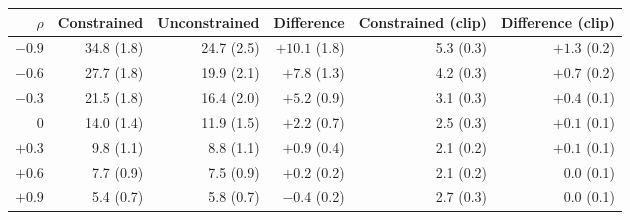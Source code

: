 \begin{tabular}{rrrrrr}
\toprule
$\rho$ & Constrained & Unconstrained & Difference & Constrained (clip) & Difference (clip) \\
\midrule
$-0.9$ & 34.8 (1.8) & 24.7 (2.5) & $+10.1$ (1.8) & 5.3 (0.3) & $+1.3$ (0.2) \\
$-0.6$ & 27.7 (1.8) & 19.9 (2.1) & $+7.8$ (1.3) & 4.2 (0.3) & $+0.7$ (0.2) \\
$-0.3$ & 21.5 (1.8) & 16.4 (2.0) & $+5.2$ (0.9) & 3.1 (0.3) & $+0.4$ (0.1) \\
0 & 14.0 (1.4) & 11.9 (1.5) & $+2.2$ (0.7) & 2.5 (0.3) & $+0.1$ (0.1) \\
$+0.3$ & 9.8 (1.1) & 8.8 (1.1) & $+0.9$ (0.4) & 2.1 (0.2) & $+0.1$ (0.1) \\
$+0.6$ & 7.7 (0.9) & 7.5 (0.9) & $+0.2$ (0.2) & 2.1 (0.2) & $0.0$ (0.1) \\
$+0.9$ & 5.4 (0.7) & 5.8 (0.7) & $-0.4$ (0.2) & 2.7 (0.3) & $0.0$ (0.1) \\
\bottomrule
\end{tabular}

